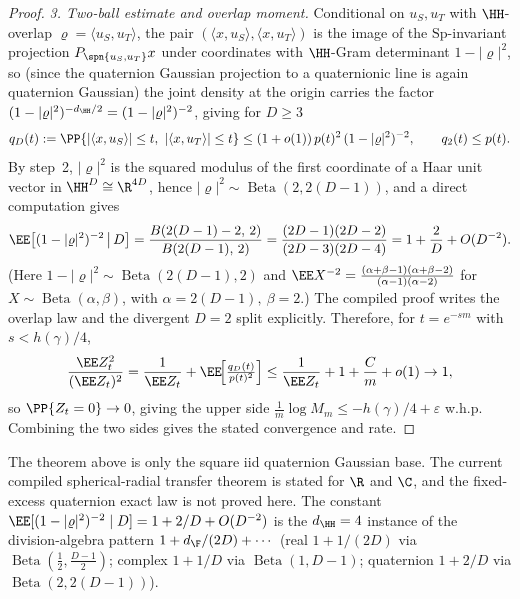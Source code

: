\begin{proof}
\emph{3. Two-ball estimate and overlap moment.}  Conditional on $u_S,u_T$ with
$\HH$-overlap $\varrho=\langle u_S,u_T\rangle$, the pair
$(\langle x,u_S\rangle,\langle x,u_T\rangle)$ is the image of the $\mathrm{Sp}$-invariant
projection $P_{\spn\{u_S,u_T\}}x$ under coordinates with $\HH$-Gram determinant
$1-|\varrho|^2$, so (since the quaternion Gaussian projection to a quaternionic line
is again quaternion Gaussian) the joint density at the origin carries the factor
$(1-|\varrho|^2)^{-d_\HH/2}=(1-|\varrho|^2)^{-2}$, giving for $D\ge3$
\[
  q_D(t):=\PP\{|\langle x,u_S\rangle|\le t,\ |\langle x,u_T\rangle|\le t\}
  \le (1+o(1))\,p(t)^2\,(1-|\varrho|^2)^{-2},\qquad q_2(t)\le p(t).
\]
By step~2, $|\varrho|^2$ is the squared modulus of the first coordinate of a Haar
unit vector in $\HH^D\cong\R^{4D}$, hence $|\varrho|^2\sim\operatorname{Beta}(2,2(D-1))$,
and a direct computation gives
\[
  \EE\big[(1-|\varrho|^2)^{-2}\,\big|\,D\big]
  =\frac{B(2(D-1)-2,\,2)}{B(2(D-1),\,2)}
  =\frac{(2D-1)(2D-2)}{(2D-3)(2D-4)}
  =1+\frac{2}{D}+O(D^{-2}).
\]
(Here $1-|\varrho|^2\sim\operatorname{Beta}(2(D-1),2)$ and $\EE X^{-2}=
\tfrac{(\alpha+\beta-1)(\alpha+\beta-2)}{(\alpha-1)(\alpha-2)}$ for
$X\sim\operatorname{Beta}(\alpha,\beta)$, with $\alpha=2(D-1),\ \beta=2$.)  The
compiled proof writes the overlap law and the divergent $D=2$ split explicitly.
Therefore, for $t=e^{-sm}$ with
$s<h(\gamma)/4$,
\[
  \frac{\EE Z_t^2}{(\EE Z_t)^2}=\frac1{\EE Z_t}
  +\EE\!\Big[\tfrac{q_D(t)}{p(t)^2}\Big]
  \le \frac1{\EE Z_t}+1+\frac{C}{m}+o(1)\to 1,
\]
so $\PP\{Z_t=0\}\to0$, giving the upper side $\tfrac1m\log M_m\le-h(\gamma)/4+\varepsilon$
w.h.p.  Combining the two sides gives the stated convergence and rate.
\end{proof}

\begin{remark}
The theorem above is only the square iid quaternion Gaussian base.  The current
compiled spherical-radial transfer theorem is stated for $\R$ and $\C$, and the
fixed-excess quaternion exact law is not proved here.  The constant
$\EE[(1-|\varrho|^2)^{-2}\mid D]=1+2/D+O(D^{-2})$ is the $d_\HH=4$ instance of the
division-algebra pattern $1+d_\F/(2D)+\cdots$ (real $1+1/(2D)$ via
$\operatorname{Beta}(\tfrac12,\tfrac{D-1}2)$; complex $1+1/D$ via
$\operatorname{Beta}(1,D-1)$; quaternion $1+2/D$ via
$\operatorname{Beta}(2,2(D-1))$).
\end{remark}
